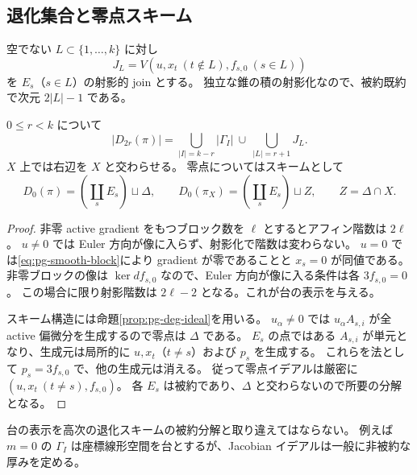 \subsection{退化集合と零点スキーム}
空でない $L\subset\{1,\ldots,k\}$ に対し
\[
J_L=V(u,x_t\ (t\notin L),f_{s,0}\ (s\in L))
\]
を $E_s$（$s\in L$）の射影的 join とする。
独立な錐の積の射影化なので、被約既約で次元 $2|L|-1$ である。
\begin{proposition}\label{prop:pg-deg-support}
$0\leq r<k$ について
\[
|D_{2r}(\pi)|=\bigcup_{|I|=k-r}|\Gamma_I|\ \cup\ \bigcup_{|L|=r+1}J_L.
\]
$X$ 上では右辺を $X$ と交わらせる。
零点についてはスキームとして
\[
D_0(\pi)=\left(\coprod_sE_s\right)\sqcup\Delta,
\qquad D_0(\pi_X)=\left(\coprod_sE_s\right)\sqcup Z,
\qquad Z=\Delta\cap X.
\]
\end{proposition}
\begin{proof}
非零 active gradient をもつブロック数を $\ell$ とするとアフィン階数は $2\ell$。
$u\neq0$ では Euler 方向が像に入らず、射影化で階数は変わらない。
$u=0$ では\eqref{eq:pg-smooth-block}により gradient が零であることと $x_s=0$ が同値である。
非零ブロックの像は $\ker df_{s,0}$ なので、Euler 方向が像に入る条件は各 $3f_{s,0}=0$。
この場合に限り射影階数は $2\ell-2$ となる。これが台の表示を与える。

スキーム構造には命題\ref{prop:pg-deg-ideal}を用いる。
$u_\alpha\neq0$ では $u_\alpha A_{s,i}$ が全 active 偏微分を生成するので零点は $\Delta$ である。
$E_s$ の点ではある $A_{s,i}$ が単元となり、生成元は局所的に $u,x_t$（$t\neq s$）および $p_s$ を生成する。
これらを法として $p_s=3f_{s,0}$ で、他の生成元は消える。
従って零点イデアルは厳密に $(u,x_t\ (t\neq s),f_{s,0})$。
各 $E_s$ は被約であり、$\Delta$ と交わらないので所要の分解となる。
\end{proof}
\begin{remark}
台の表示を高次の退化スキームの被約分解と取り違えてはならない。
例えば $m=0$ の $\Gamma_I$ は座標線形空間を台とするが、Jacobian イデアルは一般に非被約な厚みを定める。
\end{remark}

